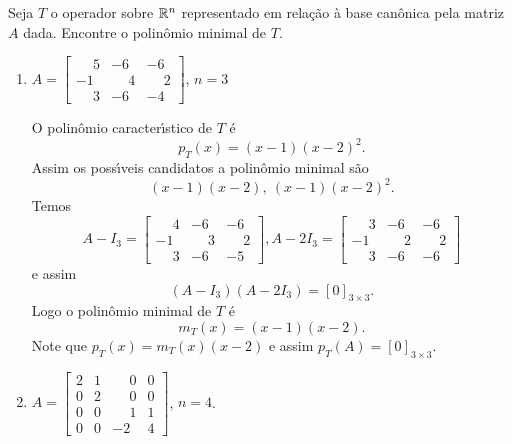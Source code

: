 \begin{exemplo}
    Seja $T$ o operador sobre $\mathbb{R}^n$ representado em rela\c{c}\~ao \`a base can\^onica pela matriz $A$ dada. Encontre o polin\^omio minimal de $T$.
    \begin{enumerate}[label={\arabic*})]
        \item $A = \begin{bmatrix}
            \phantom{-}5 & -6 & -6\\
            -1 & \phantom{-}4 & \phantom{-}2\\
            \phantom{-}3 & -6 & -4
        \end{bmatrix}$, $n = 3$
        \begin{solucao}
            O polin\^omio caracter{\'\i}stico de $T$ \'e
            \[
                p_T(x) = (x - 1)(x - 2)^2.
            \]
            Assim os poss{\'\i}veis candidatos a polin\^omio minimal s\~ao
            \[
                (x - 1)(x - 2), \ (x -1)(x - 2)^2.
            \]
            Temos
            \[
                A - I_3 = \begin{bmatrix}
                    \phantom{-}4 & -6 & -6\\
                    -1 & \phantom{-}3 & \phantom{-}2\\
                    \phantom{-}3 & -6 & -5
                \end{bmatrix},
                A - 2I_3 = \begin{bmatrix}
                    \phantom{-}3 & -6 & -6\\
                    -1 & \phantom{-}2 & \phantom{-}2\\
                    \phantom{-}3 & -6 & -6
                \end{bmatrix}
            \]
            e assim
            \[
                (A - I_3)(A - 2I_3) = [0]_{3 \times 3}.
            \]
            Logo o polin\^omio minimal de $T$ \'e
            \[
                m_T(x) = (x - 1)(x - 2).
            \]
            Note que $p_T(x) = m_T(x)(x - 2)$ e assim $p_T(A) = [0]_{3 \times 3}$.
        \end{solucao}
        \item $A = \begin{bmatrix}
            2 & 1 & \phantom{-}0 & 0\\
            0 & 2 & \phantom{-}0 & 0\\
            0 & 0 & \phantom{-}1 & 1\\
            0 & 0 & -2 & 4
        \end{bmatrix}$, $n = 4$.

\end{enumerate}
\end{exemplo}
